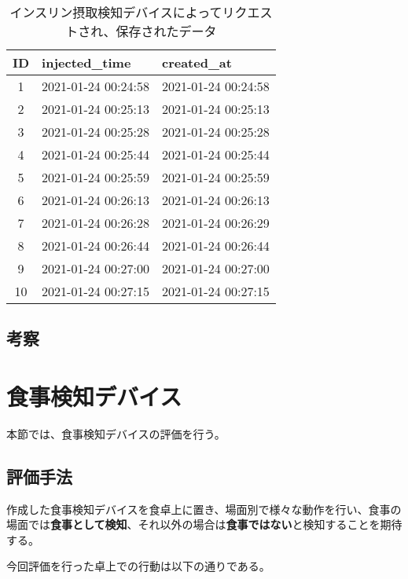 \begin{table}[htbp]
  \caption{インスリン摂取検知デバイスによってリクエストされ、保存されたデータ}
  \label{tb:insulin_detection_time}
  \begin{center}
    \begin{tabular}{|c||l|l|}
      \hline
      ID & injected\_time & created\_at \\\hline
      1 & 2021-01-24 00:24:58 & 2021-01-24 00:24:58 \\\hline
      2 & 2021-01-24 00:25:13 & 2021-01-24 00:25:13 \\\hline
      3 & 2021-01-24 00:25:28 & 2021-01-24 00:25:28 \\\hline
      4 & 2021-01-24 00:25:44 & 2021-01-24 00:25:44 \\\hline
      5 & 2021-01-24 00:25:59 & 2021-01-24 00:25:59 \\\hline
      6 & 2021-01-24 00:26:13 & 2021-01-24 00:26:13 \\\hline
      7 & 2021-01-24 00:26:28 & 2021-01-24 00:26:29 \\\hline
      8 & 2021-01-24 00:26:44 & 2021-01-24 00:26:44 \\\hline
      9 & 2021-01-24 00:27:00 & 2021-01-24 00:27:00 \\\hline
      10 & 2021-01-24 00:27:15 & 2021-01-24 00:27:15 \\\hline
    \end{tabular}
  \end{center}
\end{table}

\subsection{考察}

\section{食事検知デバイス}

本節では、食事検知デバイスの評価を行う。

\subsection{評価手法}
作成した食事検知デバイスを食卓上に置き、場面別で様々な動作を行い、食事の場面では\textbf{食事として検知}、それ以外の場合は\textbf{食事ではない}と検知することを期待する。

今回評価を行った卓上での行動は以下の通りである。

